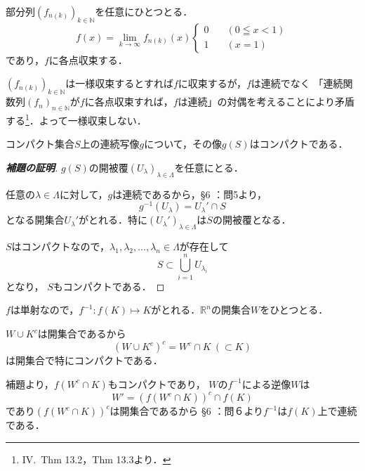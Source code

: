 
\begin{tproof}
    部分列$(f_{n(k)})_{k \in \mathbb{N}}$を任意にひとつとる．
    \[
        f(x)= \lim_{k \to \infty} f_{n(k)}(x)
        \begin{cases}
            0 \quad  & ( 0 \leqq x < 1) \\
            1  \quad & ( x=1)
        \end{cases}
    \]
    であり，$f$に各点収束する．

    $(f_{n(k)})_{k \in \mathbb{N}}$は一様収束するとすれば$f$に収束するが，$f$は連続でなく
    「連続関数列$(f_n)_{n \in \mathbb{N}}$が$f$に各点収束すれば，$f$は連続」の対偶を考えることにより矛盾する\footnote{IV.~Thm 13.2，Thm 13.3より．}．よって一様収束しない．
\end{tproof}





\begin{lemma}{}{}
    コンパクト集合$S$上の連続写像$g$について，その像$g(S)$はコンパクトである．
\end{lemma}

\begin{proof}[\textup{\textbf{補題の証明}}]
    $g(S)$の開被覆$(U_{\lambda})_{\lambda \in \Lambda}$を任意にとる．

    任意の$\lambda \in \Lambda$に対して，$g$は連続であるから，\S 6 ：問5より，
    \[
        g^{-1}(U_{\lambda}) =  U_{\lambda}'  \cap S
    \]
    となる開集合$U_{\lambda}'$がとれる．特に$(U_{\lambda}')_{\lambda \in \Lambda}$は$S$の開被覆となる．

    $S$はコンパクトなので，$\lambda_1, \lambda_2, \ldots , \lambda_n \in \Lambda$が存在して
    \[
        S \subset \bigcup_{i=1}^{n} U_{\lambda_i}
    \]
    となり， $S$もコンパクトである．
\end{proof}


\begin{tproof}
    $f$は単射なので，$f^{-1} \colon f(K) \mapsto K$がとれる．$\mathbb{R}^n$の開集合$W$をひとつとる．

    $W \cup K^c$は開集合であるから
    \[
        (W \cup K^c)^c = W^c \cap K~(\subset K)
    \]
    は開集合で特にコンパクトである．

    補題より，$f(W^c \cap K)$もコンパクトであり，
    $W$の$f^{-1}$による逆像$W$は
    \[
        W' = (f(W^c \cap K))^c \cap f(K)
    \]
    であり$(f(W^c \cap K))^c$は開集合であるから
    \S 6 ：問６より$f^{-1}$は$f(K)$上で連続である．
\end{tproof}




